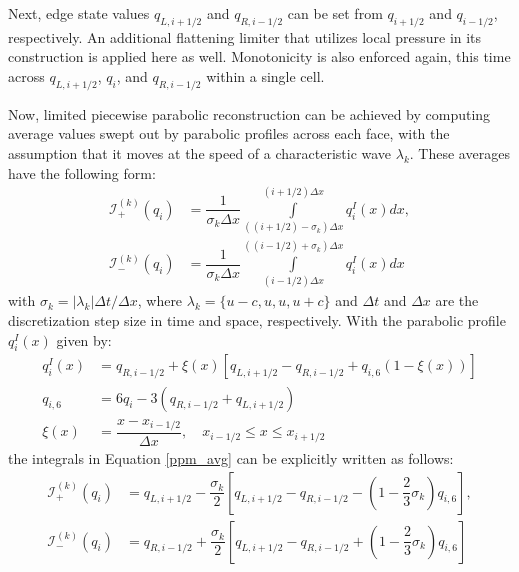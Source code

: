 Next, edge state values $q_{L, i+1/2}$ and $q_{R, i-1/2}$ can be set from $q_{i+1/2}$ and $q_{i-1/2}$, respectively. An additional flattening limiter that utilizes local pressure in its construction is applied here as well. Monotonicity is also enforced again, this time across $q_{L, i+1/2}$, $q_i$, and $q_{R, i-1/2}$ within a single cell. 

Now, limited piecewise parabolic reconstruction can be achieved by computing average values swept out by parabolic profiles across each face, with the assumption that it moves at the speed of a characteristic wave $\lambda_k$. These averages have the following form:
\begin{equation} \label{ppm_avg}
\begin{split}
\mathcal{I}_+^{(k)}(q_i) &= \dfrac{1}{\sigma_k \Delta x} \int\limits_{((i+1/2 )-\sigma_k)\Delta x}^{(i+1/2)\Delta x} q_i^I(x) dx, \\
\mathcal{I}_-^{(k)}(q_i) &= \dfrac{1}{\sigma_k \Delta x} \int\limits^{((i-1/2 )+\sigma_k)\Delta x}_{(i-1/2)\Delta x} q_i^I(x) dx
\end{split}
\end{equation}
with $\sigma_k = |\lambda_k |\Delta t/\Delta x$, where $\lambda_k = \{u-c, u, u, u+c\}$ and $\Delta t$ and $\Delta x$ are the discretization step size in time and space, respectively. With the parabolic profile $q_i^I(x)$ given by:
\begin{equation}
\begin{split}
q_i^I(x) &= q_{R,i-1/2} + \xi(x) \left[ q_{L, i+1/2} - q_{R, i-1/2} + q_{i,6}\left( 1 - \xi(x) \right) \right] \\
q_{i,6} &= 6q_i - 3 \left( q_{R, i-1/2} + q_{L,i+1/2}\right) \\
\xi(x) &= \dfrac{x - x_{i-1/2}}{\Delta x}, \quad x_{i-1/2} \leq x \leq x_{i+1/2}
\end{split}
\end{equation}
the integrals in Equation \ref{ppm_avg} can be explicitly written as follows:
\begin{equation}
\begin{split}
\mathcal{I}_+^{(k)}(q_i) &= q_{L, i+1/2} - \dfrac{\sigma_k}{2} \left[ q_{L,i+1/2} - q_{R,i-1/2} - \left( 1 - \dfrac{2}{3}\sigma_k \right)q_{i,6} \right], \\
\mathcal{I}_-^{(k)}(q_i) &= q_{R, i-1/2} + \dfrac{\sigma_k}{2} \left[ q_{L,i+1/2} - q_{R,i-1/2} + \left( 1 - \dfrac{2}{3}\sigma_k \right)q_{i,6} \right] 
\end{split}
\end{equation}

